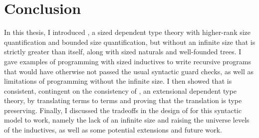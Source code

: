 \section{Conclusion}

In this thesis, I introduced \lang, a sized dependent type theory
with higher-rank size quantification and bounded size quantification,
but without an infinite size that is strictly greater than itself,
along with sized naturals and well-founded trees.
I gave examples of programming with sized inductives to write recursive programs
that would have otherwise not passed the usual syntactic guard checks,
as well as limitations of programming without the infinite size.
I then showed that \lang is consistent, contingent on the consistency of \CICE,
an extensional dependent type theory, by translating \lang terms to \CICE terms
and proving that the translation is type preserving.
Finally, I discussed the tradeoffs in the design of \lang for this syntactic model to work,
namely the lack of an infinite size and raising the universe levels of the inductives,
as well as some potential extensions and future work.